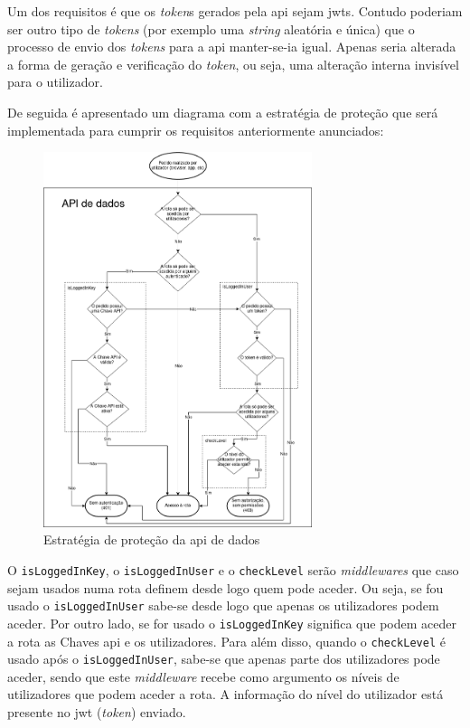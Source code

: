 Um dos requisitos é que os \textit{token}s gerados pela \acrshort{api} sejam \acrshort{jwt}s. Contudo poderiam ser outro tipo de \textit{tokens} (por exemplo uma \textit{string} aleatória e única) que o processo de envio dos \textit{tokens} para a \acrshort{api} manter-se-ia igual. Apenas seria alterada a forma de geração e verificação do \textit{token}, ou seja, uma alteração interna invisível para o utilizador.

De seguida é apresentado um diagrama com a estratégia de proteção que será implementada para cumprir os requisitos anteriormente anunciados:
\begin{figure}[H]
    \centering
    \includegraphics[width=0.7\textwidth]{img/protecaoStrag.png}
    \caption{Estratégia de proteção da \acrshort{api} de dados}\label{fig:protStrag}
\end{figure}

O \texttt{isLoggedInKey}, o \texttt{isLoggedInUser} e o \texttt{checkLevel} serão \textit{middlewares} que caso sejam usados numa rota definem desde logo quem pode aceder. Ou seja, se fou usado o \texttt{isLoggedInUser} sabe-se desde logo que apenas os utilizadores podem aceder. Por outro lado, se for usado o \texttt{isLoggedInKey} significa que podem aceder a rota as Chaves \acrshort{api} e os utilizadores. Para além disso, quando o \texttt{checkLevel} é usado após o \texttt{isLoggedInUser}, sabe-se que apenas parte dos utilizadores pode aceder, sendo que este \textit{middleware} recebe como argumento os níveis de utilizadores que podem aceder a rota. A informação do nível do utilizador está presente no \acrshort{jwt} (\textit{token}) enviado.

